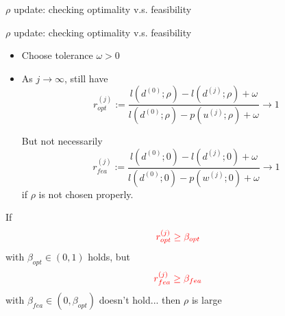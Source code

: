 \documentclass[8pt]{beamer}
\begin{document}
\begin{frame}{$\rho$ update: checking optimality v.s. feasibility}
\begin{minipage}[c]{.35\textwidth}
\end{minipage}

\end{frame}






\begin{frame}{$\rho$ update: checking optimality v.s. feasibility}

\begin{itemize}
\item   Choose tolerance $\omega>0$
\item  As $j\to \infty$, still have 
$$r^{(j)}_{opt} := \frac{l(d^{(0)};\rho) - l (d^{(j)};\rho) + \omega  }{l(d^{(0)}; \rho) - p (u^{(j)};\rho) + \omega } \to 1 $$

But not necessarily 
\[
   r^{(j)}_{fea} := \frac{l(d^{(0)};0) - l (d^{(j)};0) + \omega}{l(d^{(0)}; 0)- p(w^{(j)};0) + \omega}  \to 1
\]
if $\rho$ is not chosen properly. 
\end{itemize}
\vfill 

If 
\[ {\color{red} r^{(j)}_{opt}  \ge \beta_{opt}} \]
with $\beta_{opt} \in (0,1)$ holds, but  
\[ {\color{red} r^{(j)}_{fea} \ge \beta_{fea} } \]
with $\beta_{fea}    \in (0,\beta_{opt} )$ doesn't hold... then $\rho$ is large

\vfill

%


\end{frame}

%
%
%
%
%
%
%
%
%
%
\end{document}
